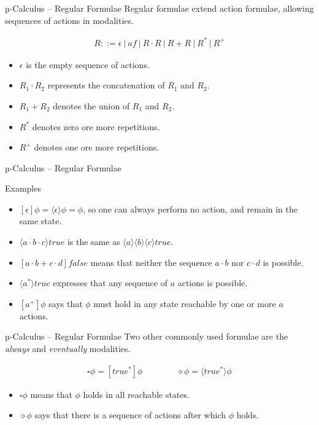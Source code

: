 \documentclass[aspectratio=1610]{beamer}
\begin{document}
  \begin{frame}{µ-Calculus – Regular Formulae}
    Regular formulae extend action formulae, allowing sequences of actions in modalities.

    \begin{align*}
      R ::= \epsilon\ |\ af\ |\ R\cdot{R}\ |\ R+R\ |\ R^*\ |\ R^+
    \end{align*}

    \begin{itemize}
      \item $\epsilon$ is the empty sequence of actions.
      \item $R_1\cdot{R_2}$ represents the concatenation of $R_1$ and $R_2$.
      \item $R_1+R_2$ denotes the union of  $R_1$ and $R_2$.
      \item $R^*$ denotes zero ore more repetitions.
      \item $R^+$ denotes one ore more repetitions.
    \end{itemize}
  \end{frame}

  \begin{frame}{µ-Calculus – Regular Formulae}
    \begin{exampleblock}{Examples}
      \begin{itemize}
        \item $[\epsilon]\phi = \langle\epsilon\rangle\phi = \phi$, so one can always perform no action, and remain in the same state.
        \item $\langle{a}\cdot{b}\cdot{c}\rangle{true}$ is the same as $\langle{a}\rangle\langle{b}\rangle\langle{c}\rangle{true}$.
        \item $[a\cdot{b} + c\cdot{d}]false$ means that neither the sequence $a\cdot{b}$ nor $c\cdot{d}$ is possible.
        \item $\langle{a^*}\rangle{true}$ expresses that any sequence of $a$ actions is possible.
        \item $[a^+]\phi$ says that $\phi$ must hold in any state reachable by one or more $a$ actions.
      \end{itemize}
    \end{exampleblock}
  \end{frame}

  \begin{frame}{µ-Calculus – Regular Formulae}
    Two other commonly used formulae are the \textit{always} and \textit{eventually} modalities.

    \begin{align*}
      \square\phi = [true^*]\phi \qquad\qquad    \diamond\phi = \langle{true^*}\rangle\phi
    \end{align*}

    \begin{itemize}
      \item $\square\phi$ means that $\phi$ holds in all reachable states.
      \item $\diamond\phi$ says that there is a sequence of actions after which $\phi$ holds.
    \end{itemize}
  \end{frame}
\end{document}
